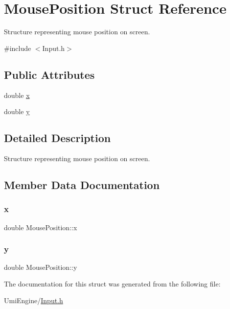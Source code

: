 \hypertarget{struct_mouse_position}{}\section{Mouse\+Position Struct Reference}
\label{struct_mouse_position}


Structure representing mouse position on screen.  




{\ttfamily \#include $<$Input.\+h$>$}

\subsection*{Public Attributes}
\begin{DoxyCompactItemize}
\item 
double \mbox{\hyperlink{struct_mouse_position_a1a0256a32f6fb3d46ddf8452f4739d4a}{x}}
\item 
double \mbox{\hyperlink{struct_mouse_position_a572b3244d783ddda69cb074e3a296ed2}{y}}
\end{DoxyCompactItemize}


\subsection{Detailed Description}
Structure representing mouse position on screen. 

\subsection{Member Data Documentation}
\mbox{\label{struct_mouse_position_a1a0256a32f6fb3d46ddf8452f4739d4a}} 
\subsubsection{\texorpdfstring{x}{x}}
{\footnotesize\ttfamily double Mouse\+Position\+::x}

\mbox{\label{struct_mouse_position_a572b3244d783ddda69cb074e3a296ed2}} 
\subsubsection{\texorpdfstring{y}{y}}
{\footnotesize\ttfamily double Mouse\+Position\+::y}



The documentation for this struct was generated from the following file\+:\begin{DoxyCompactItemize}
\item 
Umi\+Engine/\mbox{\hyperlink{_input_8h}{Input.\+h}}\end{DoxyCompactItemize}
